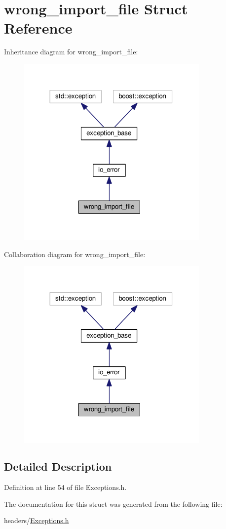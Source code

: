 \hypertarget{structwrong__import__file}{\section{wrong\+\_\+import\+\_\+file Struct Reference}
\label{structwrong__import__file}
}


Inheritance diagram for wrong\+\_\+import\+\_\+file\+:\nopagebreak
\begin{figure}[H]
\begin{center}
\leavevmode
\includegraphics[width=266pt]{structwrong__import__file__inherit__graph}
\end{center}
\end{figure}


Collaboration diagram for wrong\+\_\+import\+\_\+file\+:\nopagebreak
\begin{figure}[H]
\begin{center}
\leavevmode
\includegraphics[width=266pt]{structwrong__import__file__coll__graph}
\end{center}
\end{figure}


\subsection{Detailed Description}


Definition at line 54 of file Exceptions.\+h.



The documentation for this struct was generated from the following file\+:\begin{DoxyCompactItemize}
\item 
headers/\hyperlink{Exceptions_8h}{Exceptions.\+h}\end{DoxyCompactItemize}
